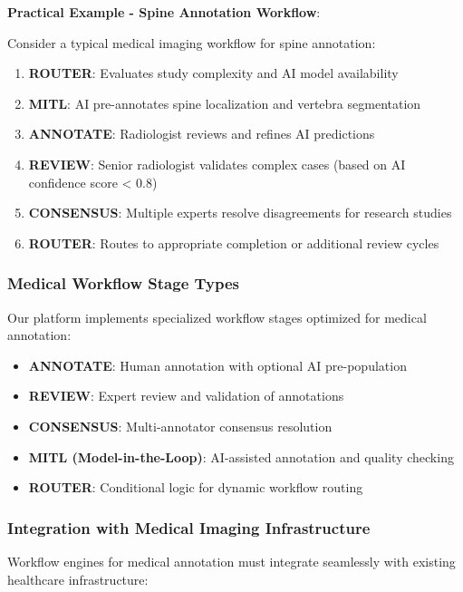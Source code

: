 \textbf{Practical Example - Spine Annotation Workflow}:

Consider a typical medical imaging workflow for spine annotation:

\begin{enumerate}
    \item \textbf{ROUTER}: Evaluates study complexity and AI model availability
    \item \textbf{MITL}: AI pre-annotates spine localization and vertebra segmentation
    \item \textbf{ANNOTATE}: Radiologist reviews and refines AI predictions
    \item \textbf{REVIEW}: Senior radiologist validates complex cases (based on AI confidence score < 0.8)
    \item \textbf{CONSENSUS}: Multiple experts resolve disagreements for research studies
    \item \textbf{ROUTER}: Routes to appropriate completion or additional review cycles
\end{enumerate}

\subsubsection{Medical Workflow Stage Types}

Our platform implements specialized workflow stages optimized for medical annotation:

\begin{itemize}
    \item \textbf{ANNOTATE}: Human annotation with optional AI pre-population
    \item \textbf{REVIEW}: Expert review and validation of annotations
    \item \textbf{CONSENSUS}: Multi-annotator consensus resolution
    \item \textbf{MITL (Model-in-the-Loop)}: AI-assisted annotation and quality checking
    \item \textbf{ROUTER}: Conditional logic for dynamic workflow routing
\end{itemize}

\subsubsection{Integration with Medical Imaging Infrastructure}

Workflow engines for medical annotation must integrate seamlessly with existing healthcare infrastructure:

